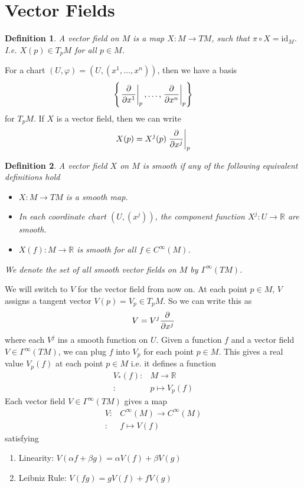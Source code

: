 \documentclass[a4paper]{article}
\newtheorem*{defn}{Definition}
\begin{document}
\section*{Vector Fields}%

\begin{defn}
  A vector field on $M$ is a map $X: M \rightarrow TM$, such that $\pi \circ X = \text{id}_M$. I.e. $X(p) \in T_pM$ for all $p \in M$.
\end{defn}

For a chart $(U, \varphi) = (U, (x^1, \dots, x^n))$, then we have a basis 
\[
  \left\{ \eval{\pdv{}{x^1}}_p, \dots, \eval{\pdv{}{x^n}}_p \right\}
\]
for $T_pM$. If $X$ is a vector field, then we can write
\[
  X(p) = X^j(p) \eval{\pdv{}{x^j}}_p
\]

\begin{defn}
  A vector field $X$ on $M$ is smooth if any of the following equivalent definitions hold
  \begin{itemize}
    \item $X: M \rightarrow TM$ is a smooth map.
    \item In each coordinate chart $(U, (x^j))$, the component function $X^j: U \rightarrow \mathds{R}$ are smooth.
    \item $X (f): M \rightarrow \mathds{R}$ is smooth for all $f \in C^{\infty}(M)$.
  \end{itemize}
We denote the set of all smooth vector fields on $M$ by $\Gamma^{\infty}(TM)$.
\end{defn}

We will switch to $V$ for the vector field from now on. At each point $p \in M$, $V$ assigns a tangent vector $V(p) = V_p \in T_pM$. So we can write this as 
\[
  V = V^j \pdv{}{x^j}
\]
where each $V^j$ ins a smooth function on $U$. Given a function $f$ and a vector field $V \in \Gamma^{\infty}(TM)$, we can plug $f$ into $V_p$ for each point $p \in M$. This gives a real value $V_p(f)$ at each point $p \in M$ i.e. it defines a function 
\[
  \begin{aligned}
    V_*(f):& M \rightarrow \mathds{R} \\
    :& p \mapsto V_p(f)
  \end{aligned}
\]
Each vector field $V \in \Gamma^{\infty}(TM)$ gives a map
\[
  \begin{aligned}
    V:& C^{\infty}(M) \rightarrow C^{\infty}(M) \\
    :& f \mapsto V(f)
  \end{aligned}
\]
satisfying
\begin{enumerate}
  \item Linearity: $V(\alpha f + \beta g) = \alpha V(f) + \beta V(g)$ 
  \item Leibniz Rule: $V(fg) = gV(f) + fV(g)$
\end{enumerate}
\end{document}
